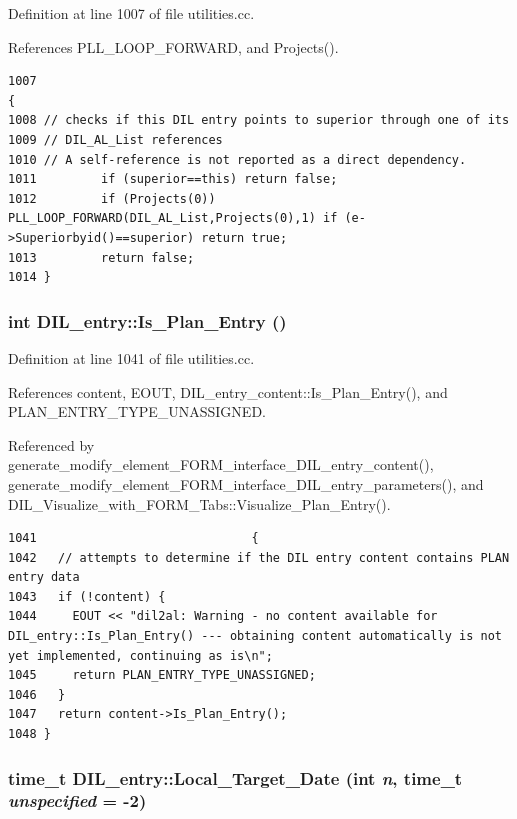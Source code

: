 Definition at line 1007 of file utilities.cc.

References PLL\_\-LOOP\_\-FORWARD, and Projects().



\footnotesize\begin{verbatim}1007                                                                   {
1008 // checks if this DIL entry points to superior through one of its
1009 // DIL_AL_List references
1010 // A self-reference is not reported as a direct dependency.
1011         if (superior==this) return false;
1012         if (Projects(0)) PLL_LOOP_FORWARD(DIL_AL_List,Projects(0),1) if (e->Superiorbyid()==superior) return true;
1013         return false;
1014 }
\end{verbatim}\normalsize 
{}
\subsubsection{\setlength{\rightskip}{0pt plus 5cm}int DIL\_\-entry::Is\_\-Plan\_\-Entry ()}\label{classDIL__entry_a21}




Definition at line 1041 of file utilities.cc.

References content, EOUT, DIL\_\-entry\_\-content::Is\_\-Plan\_\-Entry(), and PLAN\_\-ENTRY\_\-TYPE\_\-UNASSIGNED.

Referenced by generate\_\-modify\_\-element\_\-FORM\_\-interface\_\-DIL\_\-entry\_\-content(), generate\_\-modify\_\-element\_\-FORM\_\-interface\_\-DIL\_\-entry\_\-parameters(), and DIL\_\-Visualize\_\-with\_\-FORM\_\-Tabs::Visualize\_\-Plan\_\-Entry().



\footnotesize\begin{verbatim}1041                              {
1042   // attempts to determine if the DIL entry content contains PLAN entry data
1043   if (!content) {
1044     EOUT << "dil2al: Warning - no content available for DIL_entry::Is_Plan_Entry() --- obtaining content automatically is not yet implemented, continuing as is\n";
1045     return PLAN_ENTRY_TYPE_UNASSIGNED;
1046   }
1047   return content->Is_Plan_Entry();
1048 }
\end{verbatim}\normalsize 
{}
\subsubsection{\setlength{\rightskip}{0pt plus 5cm}time\_\-t DIL\_\-entry::Local\_\-Target\_\-Date (int {\em n}, time\_\-t {\em unspecified} = -2)\hspace{0.3cm}{\tt  [inline]}}\label{classDIL__entry_a13}




